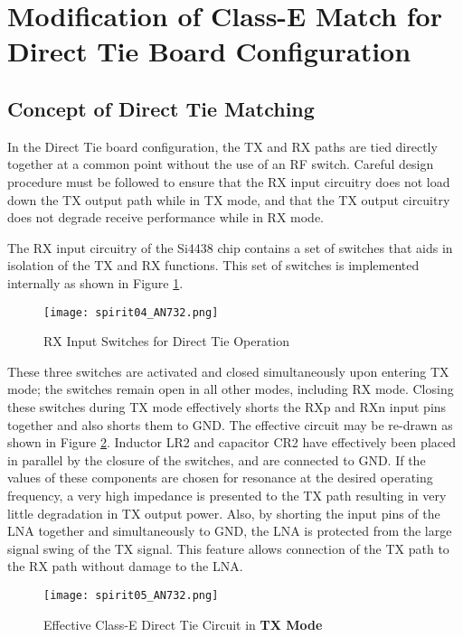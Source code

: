   \section{Modification of Class-E Match for Direct Tie Board Configuration}
    \subsection{Concept of Direct Tie Matching}
      In the Direct Tie board configuration, the TX and RX paths are tied directly together at a 
      common point without the use of an RF switch. Careful design procedure must be followed to 
      ensure that the RX input circuitry does not load down the TX output path while in TX mode, 
      and that the TX output circuitry does not degrade receive performance while in RX mode.
      
      The RX input circuitry of the Si4438 chip contains a set of switches that aids in isolation 
      of the TX and RX functions. This set of switches is implemented internally as shown in Figure 
      \ref{EXP001:fig_spirit04}.
    
      \begin{figure}[ht!]  %
        \centering
        \texttt{[image: spirit04\_AN732.png]}
        \caption{RX Input Switches for Direct Tie Operation \cite[s.~19]{AN648SiliconLabs}}
        \label{EXP001:fig_spirit04}
      \end{figure}
      
      These three switches are activated and closed simultaneously upon entering TX mode; the 
      switches remain open in all other modes, including RX mode. Closing these switches during TX 
      mode effectively shorts the RXp and RXn input pins together and also shorts them to GND. The 
      effective circuit may be re-drawn as shown in Figure \ref{EXP001:fig_spirit05}. Inductor LR2 
      and capacitor CR2 have effectively been placed in parallel by the closure of the switches, 
      and are connected to GND. If the values of these components are chosen for resonance at the 
      desired operating frequency, a very high impedance is presented to the TX path resulting in 
      very little degradation in TX output power. Also, by shorting the input pins of the LNA 
      together and simultaneously to GND, the LNA is protected from the large signal swing of the 
      TX signal. This feature allows connection of the TX path to the RX path without damage to the 
      LNA.
      \begin{figure}[ht!]  %
        \centering
        \texttt{[image: spirit05\_AN732.png]}
        \caption{Effective Class-E Direct Tie Circuit in \textbf{TX Mode}  
                 \cite[s.~20]{AN648SiliconLabs}}
        \label{EXP001:fig_spirit05}
      \end{figure}
      
